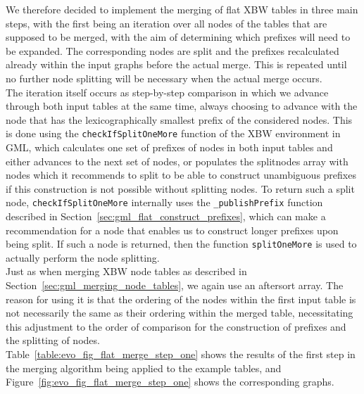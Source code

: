 \documentclass[a4paper,12pt,twoside,BCOR=10mm]{scrbook}
\begin{document}
We therefore decided to implement the merging of flat XBW tables in three main steps,
with the first being an iteration over all nodes of the tables that are supposed to be merged,
with the aim of determining which prefixes will need to be expanded. The corresponding nodes are
split and the prefixes recalculated already within the input graphs before the actual merge.
This is repeated until no further node splitting will be necessary when the actual
merge occurs. \\
The iteration itself occurs as step-by-step comparison in which we advance through
both input tables at the same time, always choosing to advance with the node that has the lexicographically
smallest prefix of the considered nodes.
This is done using the \texttt{checkIfSplitOneMore} function of the XBW environment in GML,
which calculates one set of prefixes of nodes in both input tables
and either advances to the next set of nodes, or populates the splitnodes array
with nodes which it recommends to split to be able to construct unambiguous prefixes if this
construction is not possible without splitting nodes.
To return such a split node, \texttt{checkIfSplitOneMore} internally uses the \texttt{\_publishPrefix} function
described in Section~\ref{sec:gml_flat_construct_prefixes}, which can make a recommendation for a
node that enables us to construct longer prefixes upon being split.
If such a node is returned, then the function \texttt{splitOneMore} is used to actually
perform the node splitting. \\
Just as when merging XBW node tables as described in Section~\ref{sec:gml_merging_node_tables},
we again use an aftersort array.
The reason for using it is that the ordering of the nodes within the first input table is not necessarily the
same as their ordering within the merged table, necessitating this adjustment to the order of comparison
for the construction of prefixes and the splitting of nodes. \\
Table~\ref{table:evo_fig_flat_merge_step_one} shows the results of the first step in the merging algorithm being applied
to the example tables, and Figure~\ref{fig:evo_fig_flat_merge_step_one} shows the corresponding graphs.
\end{document}
